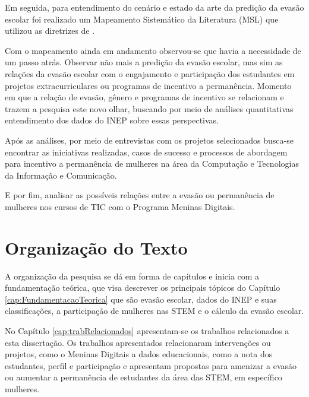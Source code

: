 Em seguida, para entendimento do cenário e estado da arte da predição da evasão escolar foi realizado um Mapeamento Sistemático da Literatura (MSL) que utilizou as diretrizes de . 

Com o mapeamento ainda em andamento observou-se que havia a necessidade de um passo atrás. Observar não mais a predição da evasão escolar, mas sim as relações da evasão escolar com o engajamento e participação dos estudantes em projetos extracurriculares ou programas de incentivo a permanência. Momento em que a relação de evasão, gênero e programas de incentivo se relacionam e trazem a pesquisa este novo olhar, buscando por meio de análises quantitativas entendimento dos dados do INEP sobre essas perspectivas. 

Após as análises, por meio de entrevistas com os projetos selecionados busca-se encontrar as iniciativas realizadas, casos de sucesso e processos de abordagem para incentivo a permanência de mulheres na área da Computação e Tecnologias da Informação e Comunicação.

E por fim, analisar as possíveis relações entre a evasão ou permanência de mulheres nos cursos de TIC com o Programa Meninas Digitais. 




\section{Organização do Texto}\label{sec:Estrutura}
A organização da pesquisa se dá em forma de capítulos e inicia com a fundamentação teórica, que visa descrever os principais tópicos do Capítulo \ref{cap:FundamentacaoTeorica} que são evasão escolar, dados do INEP e suas classificações, a participação de mulheres nas STEM e o cálculo da evasão escolar.

No Capítulo \ref{cap:trabRelacionados} apresentam-se os trabalhos relacionados a esta dissertação. Os trabalhos apresentados relacionaram intervenções ou projetos, como o Meninas Digitais a dados educacionais, como a nota dos estudantes, perfil e participação e apresentam propostas para amenizar a evasão ou aumentar a permanência de estudantes da área das STEM, em específico mulheres.


